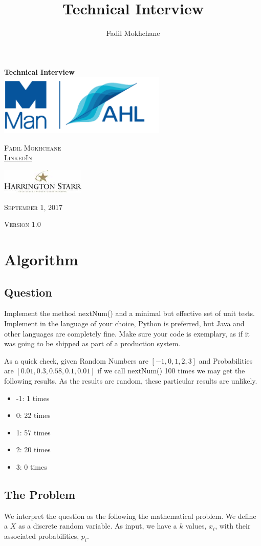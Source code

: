 \documentclass[12pt,a4paper,article]{memoir} %
\title{Technical Interview}
\author{Fadil Mokhchane}
\newlength\drop
\newcommand*\titleM{\begingroup%
\setlength\drop{0.08\textheight}
\centering
\vspace*{\drop}
{\Huge\bfseries Technical Interview}\\[\baselineskip]
\vfill
\includegraphics[width=0.6\textwidth]{img/logo.png}\par\vspace{1cm}
\vfill
{\Huge\scshape Fadil Mokhchane \\ 
\small \href{https://www.linkedin.com/in/fadil/}{LinkedIn} }\par
\vspace{1cm}
\includegraphics[width=0.3\textwidth]{img/harrington.jpg}\par
\vfill
\vspace*{2\drop}
{\scshape September 1, 2017}\par
{\scshape \small Version 1.0}\par
\endgroup}
\begin{document}
\begin{titlingpage}
\titleM
\end{titlingpage}

\newpage
\tableofcontents* %
{}
\listoffigures
\newpage

\chapter{Algorithm}
\section{Question}
Implement the method nextNum() and a minimal but effective set of unit tests. 
Implement in the language of your choice, Python is preferred, but Java and 
other languages are completely fine. 
Make sure your code is exemplary, as if it was going to be shipped as part of a production system.

As a quick check, given Random Numbers are $[-1, 0, 1, 2, 3]$ and 
Probabilities are $[0.01, 0.3, 0.58, 0.1, 0.01]$ if we call nextNum() 100 times 
we may get the following results. As the results are random, these particular results are unlikely.
\begin{itemize}
	\item -1: 1 times 
	\item 0: 22 times
	\item 1: 57 times 
	\item 2: 20 times
	\item 3: 0 times 
\end{itemize}

\section{The Problem}
We interpret the question as the following the mathematical problem. 
We define a $X$ as a discrete random variable. 
As input, we have a $k$ values, $x_i$, with their associated probabilities, $p_i$.
\end{document}

